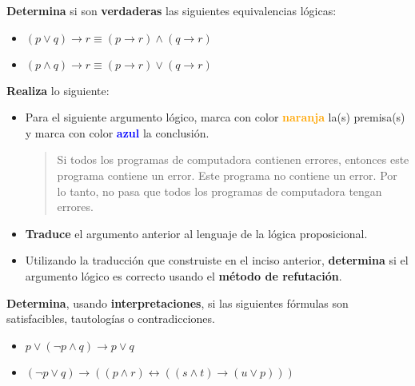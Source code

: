 \documentclass[oneside]{style}
\begin{document}
\begin{questions}[label=\protect\circled{\bfseries\arabic*}]
    \question
    {
        \textbf{Determina} si son \textbf{verdaderas} las siguientes 
        equivalencias lógicas:
        \begin{itemize}
            \item $(p \lor q) \rightarrow r \equiv (p \rightarrow r) \land 
            (q \rightarrow r)$

            \item $(p \land q) \rightarrow r \equiv (p \rightarrow r) \lor 
            (q \rightarrow r)$
        \end{itemize}
    }

    \question
    {

        \textbf{Realiza} lo siguiente:
        \begin{itemize}
            \item Para el siguiente argumento lógico, marca con color 
            \textcolor{orange}{\textbf{naranja}} la(s) premisa(s) y marca con 
            color \textcolor{blue}{\textbf{azul}} la conclusión.

            \begin{quote}
                \centering
                Si todos los programas de computadora contienen errores, 
                entonces este programa contiene un error. Este programa no 
                contiene un error. Por lo tanto, no pasa que todos los 
                programas de computadora tengan errores.
            \end{quote}
    
            \item \textbf{Traduce} el argumento anterior al lenguaje de la lógica 
            proposicional.
    
            \item Utilizando la traducción que construiste en el inciso anterior, 
            \textbf{determina} si el argumento lógico es correcto usando el 
            \textbf{método de refutación}.
        \end{itemize}
    }

    \question
    {
        \textbf{Determina}, usando \textbf{interpretaciones}, si las 
        siguientes fórmulas son satisfacibles, tautologías o 
        contradicciones. 
        \begin{itemize}
            \item $p \lor (\neg p \land q) \rightarrow p \lor q$
            \item $(\neg p \lor q) \rightarrow ((p \land r) \leftrightarrow
            ((s \land t) \rightarrow (u \lor p)))$
        \end{itemize}
    }


\end{questions}
\end{document}
